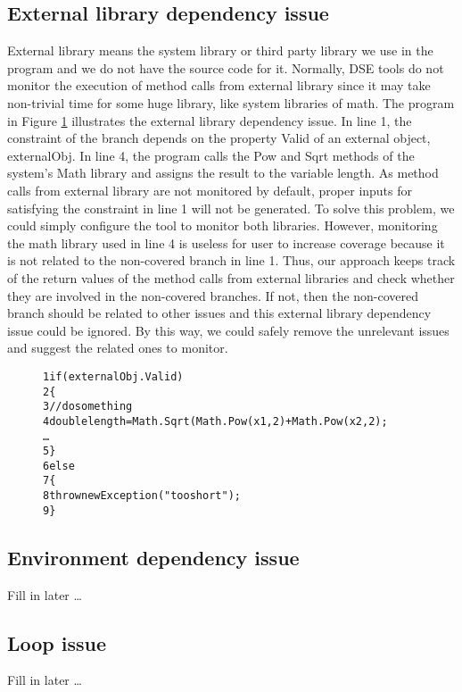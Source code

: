 \subsection{External library dependency issue}
External library means the system library or third party library we use in the program and we do not have the source code for it. Normally, DSE tools do not monitor the execution of method calls from external library since it may take non-trivial time for some huge library, like system libraries of math. The program in Figure \ref{fig:external} illustrates the external library dependency issue. In line 1, the constraint of the branch depends on the property Valid of an external object, externalObj. In line 4, the program calls the Pow and Sqrt methods of the system's Math library and assigns the result to the variable length. As method calls from external library are not monitored by default, proper inputs for satisfying the constraint in line 1 will not be generated. To solve this problem, we could simply configure the tool to monitor both libraries. However, monitoring the math library used in line 4 is useless for user to increase coverage because it is not related to the non-covered branch in line 1. Thus, our approach keeps track of the return values of the method calls from external libraries and check whether they are involved in the non-covered branches. If not, then the non-covered branch should be related to other issues and this external library dependency issue could be ignored. By this way, we could safely remove the unrelevant issues and suggest the related ones to monitor.
\begin{figure}
\begin{CodeOut}
\begin{alltt}
1   if(externalObj.Valid)
2   \{
3       // do some thing
4       double length = Math.Sqrt(Math.Pow(x1, 2) + Math.Pow(x2, 2);
        \ldots
5   \}
6   else
7   \{
8       throw new Exception("too short");
9   \}
\end{alltt}
\end{CodeOut}
\label{fig:external}
\end{figure}
\subsection{Environment dependency issue}
Fill in later \ldots
\subsection{Loop issue}
Fill in later \ldots


   